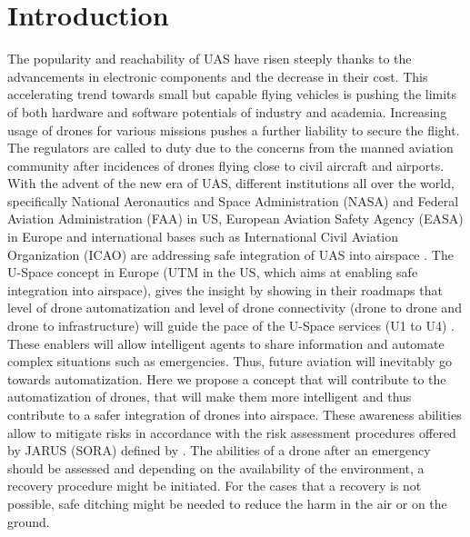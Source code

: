 
\chapter{Introduction}

The popularity and reachability of UAS have risen steeply thanks to the advancements in electronic components and the decrease in their cost. 
This accelerating trend towards small but capable flying vehicles is pushing the limits of both hardware and software potentials of industry and academia. 
Increasing usage of drones for various missions pushes a further liability to secure the flight.
The regulators are called to duty due to the concerns from the manned aviation community after incidences of drones flying close to civil aircraft and airports. 
With the advent of the new era of UAS, different institutions all over the world, specifically National Aeronautics and Space Administration (NASA) 
\cite{kopardekarunmanned} and Federal Aviation Administration (FAA) \cite{FAA_UASintegration} in US, European Aviation Safety Agency (EASA) \cite{A_NPA_EASA2015} in Europe and international bases such as International Civil Aviation Organization (ICAO) \cite{ICAO_Circular} are addressing safe integration of UAS into airspace \cite{baskaya2016flexible}.
The U-Space concept in Europe (UTM in the US, which aims at enabling safe integration into airspace), gives the insight by showing in their roadmaps that level of drone automatization and level of drone connectivity (drone to drone and drone to infrastructure) will guide the pace of the U-Space services (U1 to U4) \cite{undertaking2017u}. 
These enablers will allow intelligent agents to share information and automate complex situations such as emergencies. 
Thus, future aviation will inevitably go towards automatization. 
Here we propose a concept that will contribute to the automatization of drones, that will make them more intelligent and thus contribute to a safer integration of drones into airspace. 
These awareness abilities allow to mitigate risks in accordance with the risk assessment procedures offered by JARUS (SORA) \cite{SORA} defined by \cite{EASAopinion2018}. 
The abilities of a drone after an emergency should be assessed and depending on the availability of the environment, a recovery procedure might be initiated. 
For the cases that a recovery is not possible, safe ditching might be needed to reduce the harm in the air or on the ground. 

